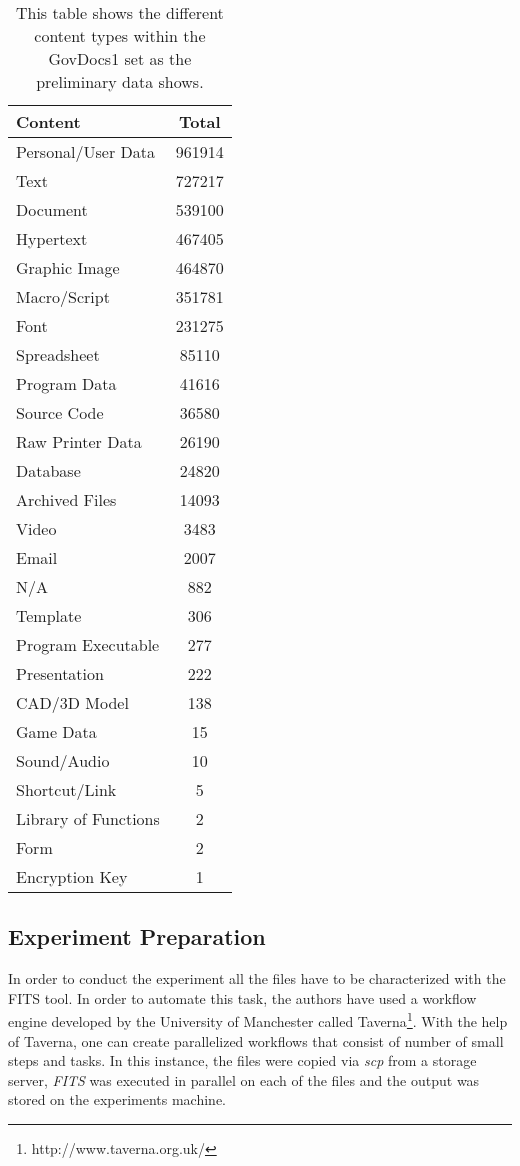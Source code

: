 \begin{table}
\centering
\begin{tabular}{l || c }
\hline
Content & Total \\
\hline
\hline
  Personal/User Data & 961914\\
  Text & 727217 \\
  Document & 539100 \\
  Hypertext & 467405 \\
  Graphic Image & 464870 \\
  Macro/Script &    351781 \\
  Font & 231275 \\
  Spreadsheet & 85110\\
  Program Data  &      41616\\
  Source Code & 36580 \\
  Raw Printer Data &  26190 \\
  Database & 24820 \\
  Archived Files & 14093 \\
  Video &  3483 \\
  Email & 2007 \\
  N/A  & 882 \\
  Template & 306\\
  Program Executable & 277\\
  Presentation & 222 \\
  CAD/3D Model & 138 \\
  Game Data &15\\
  Sound/Audio & 10 \\
  Shortcut/Link & 5 \\
  Library of Functions & 2\\
  Form & 2 \\
  Encryption Key  & 1\\
\hline
\end{tabular}
\label{tab:govdoc1_content}
\caption{This table shows the different content types within the GovDocs1 set as the preliminary data shows.}
\end{table}

\subsection{Experiment Preparation}
In order to conduct the experiment all the files have to be characterized with the FITS tool. In order to automate this task, the authors have used a workflow engine developed by the University of Manchester called Taverna\footnote{http://www.taverna.org.uk/}. With the help of Taverna, one can create parallelized workflows that consist of number of small steps and tasks. In this instance, the files were copied via \textit{scp} from a storage server, \textit{FITS} was executed in parallel on each of the files and the output was stored on the experiments machine.

